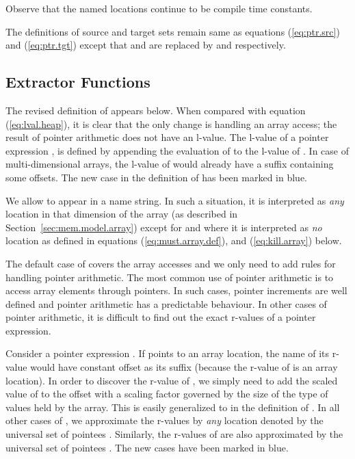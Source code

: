 \documentclass[a4paper,11pt,fleqn]{article}
\newcommand{\must}{\text{\sf\em Must\/}\xspace}
\newcommand{\Kill}{\text{{\sf\em Kill}}\xspace}
\begin{document}
Observe that the named locations continue to be compile time constants.

The definitions of source and target sets remain same as equations
(\ref{eq:ptr.src}) and (\ref{eq:ptr.tgt}) except that \structp and \structm
are replaced by \genp and \genm respectively.


\subsection{Extractor Functions}

The revised definition of \lval appears below. When compared with
equation (\ref{eq:lval.heap}), it is clear that the only change is
handling an array access; the result of pointer arithmetic does not have
an l-value. The l-value of a pointer
expression \text{}, is defined by appending the evaluation of
 to the l-value of . In case of multi-dimensional arrays, the
l-value of  would already have a suffix containing some offsets.
The new case in the definition of \lval has been marked in blue.

We allow  to appear in a name string. In such a situation, it 
is interpreted as {\em any\/} location in that dimension of the array (as described
in Section~\ref{sec:mem.model.array}) except for \must and \Kill where
it is interpreted as {\em no\/} location as defined in equations
(\ref{eq:must.array.def}), and (\ref{eq:kill.array}) below.

The default case of \rval covers the array accesses and we only need
to add rules for handling pointer arithmetic. The most common use of
pointer arithmetic is to access array elements through pointers. In
such cases, pointer increments are well defined and pointer arithmetic
has a predictable behaviour. In other cases of pointer arithmetic, it is
difficult to find out the exact r-values of a pointer expression.

Consider a pointer expression \text{}. If  points to an array
location, the name of its r-value would have constant offset as its suffix 
(because the r-value of  is an array location). In order to discover
the r-value of \text{}, we simply need to add the scaled value of
 to the offset with a scaling factor governed by the size of the type
of values held by the array. This is easily generalized to \text{} in the definition of \rval. 
In all other cases of \text{}, we
approximate the r-values by {\em any\/} location denoted by the universal
set of pointees \target. Similarly, the r-values of \text{} are 
also approximated by the universal set of pointees \target.
The new cases have been marked in blue.
\end{document}
